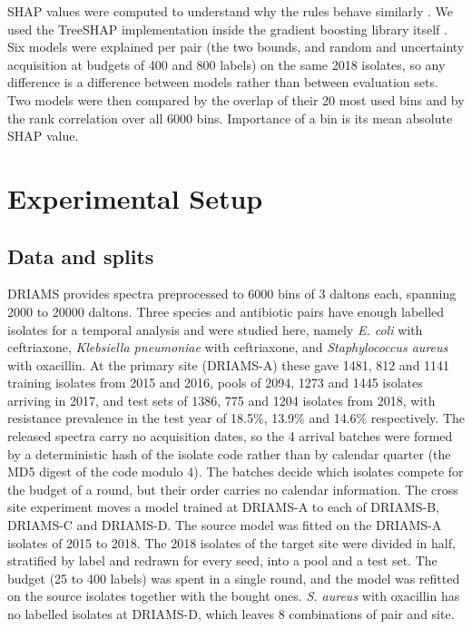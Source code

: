 \documentclass[conference,a4paper]{IEEEtran}
\begin{document}
SHAP values were computed to understand why the rules behave similarly \cite{r18}. We used the TreeSHAP implementation inside the gradient boosting library itself \cite{r19}. Six models were explained per pair (the two bounds, and random and uncertainty acquisition at budgets of 400 and 800 labels) on the same 2018 isolates, so any difference is a difference between models rather than between evaluation sets. Two models were then compared by the overlap of their 20 most used bins and by the rank correlation over all 6000 bins. Importance of a bin is its mean absolute SHAP value.

\section{Experimental Setup}

\subsection{Data and splits}

DRIAMS provides spectra preprocessed to 6000 bins of 3 daltons each, spanning 2000 to 20000 daltons. Three species and antibiotic pairs have enough labelled isolates for a temporal analysis and were studied here, namely \textit{E. coli} with ceftriaxone, \textit{Klebsiella pneumoniae} with ceftriaxone, and \textit{Staphylococcus aureus} with oxacillin. At the primary site (DRIAMS-A) these gave 1481, 812 and 1141 training isolates from 2015 and 2016, pools of 2094, 1273 and 1445 isolates arriving in 2017, and test sets of 1386, 775 and 1204 isolates from 2018, with resistance prevalence in the test year of 18.5\%, 13.9\% and 14.6\% respectively. The released spectra carry no acquisition dates, so the 4 arrival batches were formed by a deterministic hash of the isolate code rather than by calendar quarter (the MD5 digest of the code modulo 4). The batches decide which isolates compete for the budget of a round, but their order carries no calendar information. The cross site experiment moves a model trained at DRIAMS-A to each of DRIAMS-B, DRIAMS-C and DRIAMS-D. The source model was fitted on the DRIAMS-A isolates of 2015 to 2018. The 2018 isolates of the target site were divided in half, stratified by label and redrawn for every seed, into a pool and a test set. The budget (25 to 400 labels) was spent in a single round, and the model was refitted on the source isolates together with the bought ones. \textit{S. aureus} with oxacillin has no labelled isolates at DRIAMS-D, which leaves 8 combinations of pair and site.
\end{document}
